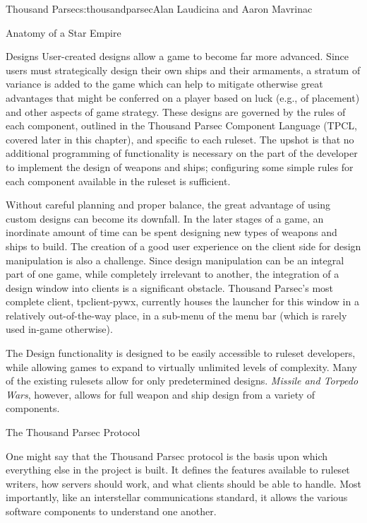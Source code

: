 \begin{aosachapter}{Thousand Parsec}{s:thousandparsec}{Alan Laudicina and Aaron Mavrinac}
\begin{aosasect1}{Anatomy of a Star Empire}
\begin{aosasect2}{Designs}
User-created designs allow a game to become far more advanced. Since
users must strategically design their own ships and their armaments, a
stratum of variance is added to the game which can help to mitigate
otherwise great advantages that might be conferred on a player based
on luck (e.g., of placement) and other aspects of game strategy. These
designs are governed by the rules of each component, outlined in the
Thousand Parsec Component Language (TPCL, covered later in this
chapter), and specific to each ruleset. The upshot is that no
additional programming of functionality is necessary on the part of
the developer to implement the design of weapons and ships;
configuring some simple rules for each component available in the
ruleset is sufficient.

Without careful planning and proper balance, the great advantage of
using custom designs can become its downfall. In the later stages of a
game, an inordinate amount of time can be spent designing new types of
weapons and ships to build. The creation of a good user experience on
the client side for design manipulation is also a challenge. Since
design manipulation can be an integral part of one game, while
completely irrelevant to another, the integration of a design window
into clients is a significant obstacle. Thousand Parsec's most
complete client, tpclient-pywx, currently houses the launcher for this
window in a relatively out-of-the-way place, in a sub-menu of the menu
bar (which is rarely used in-game otherwise).

The Design functionality is designed to be easily accessible to
ruleset developers, while allowing games to expand to virtually
unlimited levels of complexity.  Many of the existing rulesets allow
for only predetermined designs. \emph{Missile and Torpedo Wars},
however, allows for full weapon and ship design from a variety of
components.

\end{aosasect2}

\end{aosasect1}

\begin{aosasect1}{The Thousand Parsec Protocol}

One might say that the Thousand Parsec protocol is the basis upon
which everything else in the project is built. It defines the features
available to ruleset writers, how servers should work, and what
clients should be able to handle. Most importantly, like an
interstellar communications standard, it allows the various software
components to understand one another.


\end{aosasect1}
\end{aosachapter}
